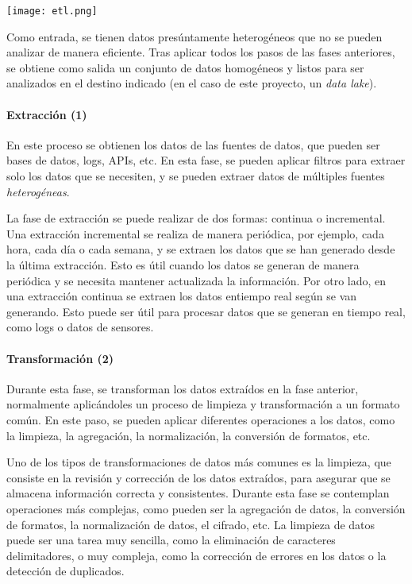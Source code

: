 \begin{minipage}{\linewidth}
	\centering
	\texttt{[image: etl.png]}
\end{minipage}

Como entrada, se tienen datos presúntamente heterogéneos que no se pueden analizar de manera eficiente.
Tras aplicar todos los pasos de las fases anteriores, se obtiene como salida un conjunto de
datos homogéneos y listos para ser analizados en el destino indicado (en el caso de este proyecto,
un \emph{data lake}).

\paragraph{Extracción (1)}
En este proceso se obtienen los datos de las fuentes de datos, que pueden ser bases de datos, logs,
APIs, etc. En esta fase, se pueden aplicar filtros para extraer solo los datos que se necesiten, y
se pueden extraer datos de múltiples fuentes \emph{heterogéneas}.

La fase de extracción se puede realizar de dos formas: continua o incremental. Una extracción incremental se
realiza de manera periódica, por ejemplo, cada hora, cada día o cada semana, y se extraen los datos
que se han generado desde la última extracción. Esto es útil cuando los datos se generan de manera
periódica y se necesita mantener actualizada la información. Por otro lado, en una extracción continua se
extraen los datos entiempo real según se van generando. Esto puede ser útil para procesar datos que se generan
en tiempo real, como logs o datos de sensores.

\newpage{}
\paragraph{Transformación (2)}
Durante esta fase, se transforman los datos extraídos en la fase anterior, normalmente aplicándoles
un proceso de limpieza y transformación a un formato común. En este paso, se pueden aplicar
diferentes operaciones a los datos, como la limpieza, la agregación, la normalización, la conversión
de formatos, etc.

Uno de los tipos de transformaciones de datos más comunes es la limpieza, que consiste en la
revisión y corrección de los datos extraídos, para asegurar que se almacena información correcta y
consistentes. Durante esta fase se contemplan operaciones más complejas, como pueden ser la agregación
de datos, la conversión de formatos, la normalización de datos, el cifrado, etc. La limpieza de datos puede
ser una tarea muy sencilla, como la eliminación de caracteres delimitadores, o muy compleja, como la
corrección de errores en los datos o la detección de duplicados.

